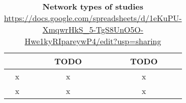 \begin{table}
\centering
\caption[Network types of studies]{\textbf{Network types of studies} \url{https://docs.google.com/spreadsheets/d/1eKuPU-XmqwrHkS_5-TgS8UnO5O-Hwe1kyRIpareywP4/edit?usp=sharing}}
\label{tab:studies-nwtype}
\vspace*{5mm}
\begin{tabular}{ccc}
	\toprule
	{}  & TODO & TODO \\
	\midrule

	x & x & x\\
	x & x & x\\
	\bottomrule
\end{tabular}
\end{table}